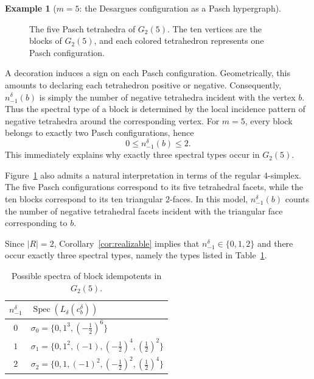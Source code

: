 \documentclass[times,11pt,reqno]{amsproc}
\theoremstyle{definition}
\newtheorem{example}[theorem]{Example}
\numberwithin{equation}{section}
\DeclareMathOperator{\Spec}{Spec}
\begin{document}
\begin{example}[$m = 5$: the Desargues configuration as a Pasch hypergraph]
\begin{figure}[h]
\caption{The five Pasch tetrahedra of $G_2(5)$. The ten vertices are the blocks of $G_2(5)$, and each colored tetrahedron represents one Pasch configuration.}
\label{fig:G25paschhypergraph}
\end{figure}

A decoration induces a sign on each Pasch configuration. Geometrically,
this amounts to declaring each tetrahedron positive or negative.
Consequently, $n_{-1}^{\delta}(b)$ is simply the number of negative tetrahedra incident with the vertex
$b$. Thus the spectral type of a block is determined by the local
incidence pattern of negative tetrahedra around the corresponding
vertex. For $m=5$, every block belongs to exactly two Pasch configurations, hence
$$
0\le n_{-1}^{\delta}(b)\le 2.
$$
This immediately explains why exactly three spectral types occur in
$G_2(5)$.

Figure~\ref{fig:G25paschhypergraph} also admits a natural interpretation in terms of the regular
$4$-simplex. The five Pasch configurations correspond to its five
tetrahedral facets, while the ten blocks correspond to its ten
triangular $2$-faces. In this model,
$n_{-1}^{\delta}(b)$ counts the number of negative tetrahedral
facets incident with the triangular face corresponding to $b$.

Since
$|R|=2$, Corollary~\ref{cor:realizable} implies that
$n^{\delta}_{-1}\in\{0,1,2\}$ and there occur exactly three spectral types, namely the types listed in
Table~\ref{tab:G25spectra}.

\begin{table}[h]
\centering
\begin{tabular}{c|l}
$n^{\delta}_{-1}$ &
$\Spec(L_\delta(c_b^\delta))$
\\
\midrule
$0$
&
$\sigma_0=\{0,1^3,(-\tfrac12)^6\}$
\\
$1$
&
$\sigma_1=\{0,1^2,(-1),(-\tfrac12)^4,(\tfrac12)^2\}$
\\
$2$
&
$\sigma_2=\{0,1,(-1)^2,(-\tfrac12)^2,(\tfrac12)^4\}$
\\
\end{tabular}
\caption{Possible spectra of block idempotents in $G_2(5)$.}
\label{tab:G25spectra}
\end{table}


\end{example}
\end{document}
